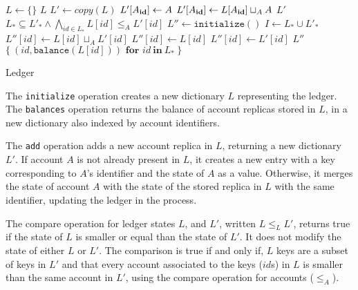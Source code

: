 \documentclass[9pt, oneside]{article}   	%
\begin{document}
\begin{algorithm}
\begin{algorithmic}[1]
    	\State $L \leftarrow \{ \}$ 
    	\State \Return $L$
    \EndFunction
    \State
        \State $L' \leftarrow \textit{copy}(L)$ 
		\State $L'[A_{\scriptsize\textbf{id}}] \leftarrow A$
	\Else
		\State $L'[A_{\scriptsize\textbf{id}}] \leftarrow L[A_{\scriptsize\textbf{id}}] \sqcup_A A$ 
	\EndIf
	\State \Return $L'$
    \EndFunction
    \State
    	\State \Return $L_* \subseteq L'_* \wedge \bigwedge_{id \in L_*} L[id] \leq_A L'[id]$ 
    \EndFunction
    \State
        \State $L'' \leftarrow \texttt{initialize}()$
        \State $I \leftarrow L_* \cup L'_*$
			\State $L''[id] \leftarrow  L[id] \sqcup_A L'[id]$  
			\State $L''[id] \leftarrow L[id]$
		\Else
			\State $L''[id] \leftarrow L'[id]$	
		\EndIf
	\EndFor
	\State \Return $L''$	
    \EndFunction
    \State
        \State \Return $\{~ (\textit{id}, \texttt{balance}(L[id])) \textbf{~for~} id ~\textbf{in}~ L_* ~\}$  
    \EndFunction
\end{algorithmic}
\caption{\label{alg:ledger} Ledger}
\end{algorithm}

The \texttt{initialize} operation creates a new dictionary $L$ representing the ledger. The \texttt{balances} operation returns the balance of account replicas stored in $L$, in a new dictionary also indexed by account identifiers. 

The \texttt{add} operation adds a new account replica in $L$, returning a new dictionary $L'$. If account $A$ is not already present in $L$, it creates a new entry with a key corresponding to $A$'s identifier and the state of $A$ as a value. Otherwise, it merges the state of account $A$ with the state of the stored replica in $L$ with the same identifier, updating the ledger in the process.

The compare operation for ledger states $L$, and $L'$, written $L \leq_L L'$, returns true if the state of $L$ is smaller or equal than the state of $L'$. It does not modify the state of either $L$ or $L'$. The comparison is true if and only if, $L$ keys are a subset of keys in $L'$ and that every account associated to the keys ($id$s) in $L$ is smaller than the same account in $L'$, using the compare operation for accounts ($\leq_A$).
\end{document}
